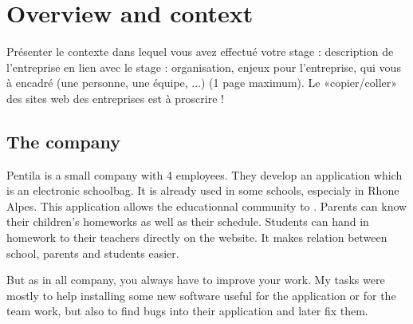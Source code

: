 
\section{Overview and context}

Présenter le contexte dans lequel vous avez effectué votre stage : description de l’entreprise en lien avec le stage : organisation, enjeux pour l’entreprise, qui vous à encadré (une personne, une équipe, ...) (1 page maximum). Le «copier/coller» des sites web des entreprises est à proscrire !

\subsection{The company}

Pentila is a small company with 4 employees. They develop an application which is an electronic schoolbag. 
It is already used in some schools, especialy in Rhone Alpes. 
This application allows the educationnal community to . Parents can know their children's homeworks as well as their schedule. Students can hand in homework to their teachers directly on the website. It makes relation between school, parents and students easier. 

But as in all company, you always have to improve your work. My tasks were mostly to help installing some new software useful for the application or for the team work, but also to find bugs into their application and later fix them.  




